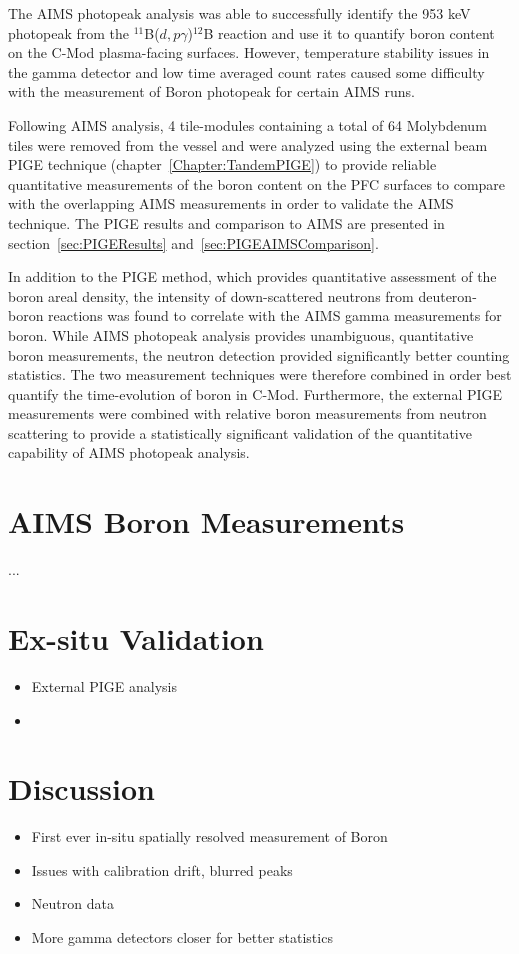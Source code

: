 \documentclass[11pt,a4paper,twocolumn]{article}
\begin{document}
The AIMS photopeak analysis was able to successfully identify the 953 keV photopeak from the $^{11}$B($d,p\gamma$)$^{12}$B reaction and use it to quantify boron content on the C-Mod plasma-facing surfaces.  However, temperature stability issues in the gamma detector and low time averaged count rates caused some difficulty with the measurement of Boron photopeak for certain AIMS runs. 

Following AIMS analysis, 4 tile-modules containing a total of 64 Molybdenum tiles were removed from the vessel and were analyzed using the external beam PIGE technique (chapter~\ref{Chapter:TandemPIGE}) to provide reliable quantitative measurements of the boron content on the PFC surfaces to compare with the overlapping AIMS measurements in order to validate the AIMS technique.  The PIGE results and comparison to AIMS are presented in section~\ref{sec:PIGEResults} and~\ref{sec:PIGEAIMSComparison}.  

In addition to the PIGE method, which provides quantitative assessment of the boron areal density, the intensity of down-scattered neutrons from deuteron-boron reactions was found to correlate with the AIMS gamma measurements for boron.  While AIMS photopeak analysis provides unambiguous, quantitative boron measurements, the neutron detection provided significantly better counting statistics.  The two measurement techniques were therefore combined in order best quantify the time-evolution of boron in C-Mod.  Furthermore, the external PIGE measurements were combined with relative boron measurements from neutron scattering to provide a statistically significant validation of the quantitative capability of AIMS photopeak analysis.

\section{AIMS Boron Measurements}
...
\section{Ex-situ Validation}
\begin{itemize}
	\item External PIGE analysis
	\item 
\end{itemize}
\section{Discussion}
\begin{itemize}
	\item First ever in-situ spatially resolved measurement of Boron
	\item Issues with calibration drift, blurred peaks
	\item Neutron data
	\item More gamma detectors closer for better statistics
\end{itemize}
\end{document}
